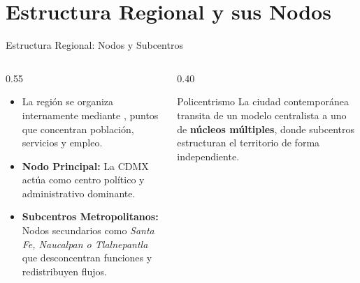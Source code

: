 \section{Estructura Regional y sus Nodos}

\begin{frame}{Estructura Regional: Nodos y Subcentros}
  \begin{columns}[T]
    \begin{column}{0.55\textwidth}
      \begin{itemize}
        \item La región se organiza internamente mediante , 
            puntos que concentran población, servicios y empleo.
        \item \textbf{Nodo Principal:} La CDMX actúa como centro político y 
            administrativo dominante.
        \item \textbf{Subcentros Metropolitanos:} Nodos secundarios como \textit{Santa Fe, Naucalpan o Tlalnepantla} 
            que desconcentran funciones y redistribuyen flujos.
      \end{itemize}
    \end{column}
    \begin{column}{0.40\textwidth}
      \begin{block}{Policentrismo}
        La ciudad contemporánea transita de un modelo centralista a uno de \textbf{núcleos múltiples}, 
        donde subcentros estructuran el territorio de forma independiente.
      \end{block}
    \end{column}
  \end{columns}
\end{frame}

